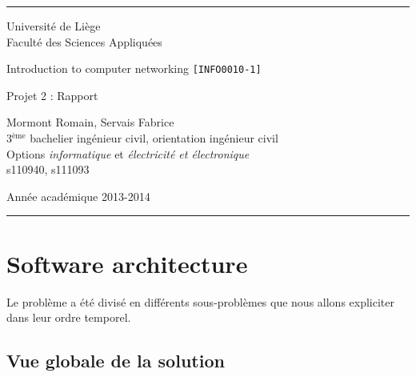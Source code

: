 \documentclass[a4paper,11pt]{article}
\begin{document}
\rule{1\linewidth}{1px}
{ \sc
\begin{center}
{\small Université de Liège}\\
{\small Faculté des Sciences Appliquées}

\end{center}

\vfill
\begin{center}

{\Huge Introduction to computer networking {\LARGE \tt [INFO0010-1]}\\}
\end{center}
\begin{center}
{\Huge Projet 2 : Rapport}
\end{center}
\begin{center}
Mormont Romain, Servais Fabrice\\
{\small 3$^{\text{ème}}$  bachelier ingénieur civil, orientation ingénieur civil}\\
{\small Options \textit{informatique} et \textit{électricité et électronique}}\\
{\small s110940, s111093}
\end{center}

\vfill
\begin{center}
Année académique 2013-2014\\
\end{center}
}
\rule{1\linewidth}{1px}
\newpage
\tableofcontents
\newpage
\section{Software architecture}
Le problème a été divisé en différents sous-problèmes que nous allons expliciter dans leur ordre temporel.

	\subsection{Vue globale de la solution}
\end{document}
